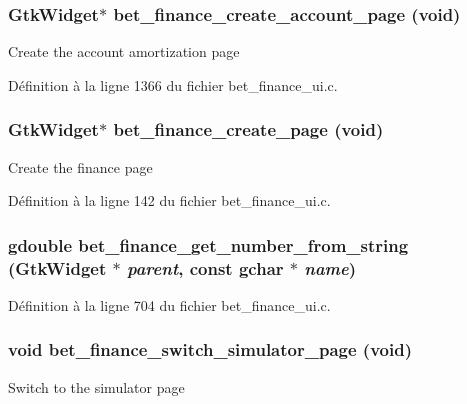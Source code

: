 \subsubsection[{bet\_\-finance\_\-create\_\-account\_\-page}]{\setlength{\rightskip}{0pt plus 5cm}GtkWidget$\ast$ bet\_\-finance\_\-create\_\-account\_\-page (void)}\label{bet__finance__ui_8c_a96bad4699d87b533c1c4f2f51f285e2a}
Create the account amortization page 

Définition à la ligne 1366 du fichier bet\_\-finance\_\-ui.c.

\subsubsection[{bet\_\-finance\_\-create\_\-page}]{\setlength{\rightskip}{0pt plus 5cm}GtkWidget$\ast$ bet\_\-finance\_\-create\_\-page (void)}\label{bet__finance__ui_8c_a98569354482d0a913898ce67b30e1557}
Create the finance page 

Définition à la ligne 142 du fichier bet\_\-finance\_\-ui.c.

\subsubsection[{bet\_\-finance\_\-get\_\-number\_\-from\_\-string}]{\setlength{\rightskip}{0pt plus 5cm}gdouble bet\_\-finance\_\-get\_\-number\_\-from\_\-string (GtkWidget $\ast$ {\em parent}, \/  const gchar $\ast$ {\em name})}\label{bet__finance__ui_8c_a3b9902404c8eb1a244e0a57f4e9bf079}


Définition à la ligne 704 du fichier bet\_\-finance\_\-ui.c.

\subsubsection[{bet\_\-finance\_\-switch\_\-simulator\_\-page}]{\setlength{\rightskip}{0pt plus 5cm}void bet\_\-finance\_\-switch\_\-simulator\_\-page (void)}\label{bet__finance__ui_8c_acd225a5272ed6727f094bd25e7cf3cd7}
Switch to the simulator page 

